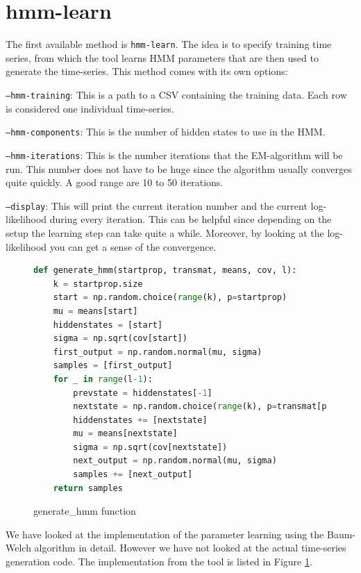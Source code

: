 \section{hmm-learn}

The first available method is \texttt{hmm-learn}. The idea is to specify training time series, from which the tool learns HMM parameters that are then used to generate the time-series. This method comes with its own options:

\texttt{---hmm-training}: This is a path to a CSV containing the training data. Each row is considered one individual time-series. 

\texttt{---hmm-components}: This is the number of hidden states to use in the HMM. 

\texttt{---hmm-iterations}: This is the number iterations that the EM-algorithm will be run. This number does not have to be huge since the algorithm usually converges quite quickly. A good range are 10 to 50 iterations.

\texttt{---display}: This will print the current iteration number and the current log-likelihood during every iteration. This can be helpful since depending on the setup the learning step can take quite a while. Moreover, by looking at the log-likelihood you can get a sense of the convergence. 

\begin{figure}
\begin{singlespace}
\begin{lstlisting}[language=Python]
def generate_hmm(startprop, transmat, means, cov, l):
    k = startprop.size
    start = np.random.choice(range(k), p=startprop)
    mu = means[start]
    hiddenstates = [start]
    sigma = np.sqrt(cov[start])
    first_output = np.random.normal(mu, sigma)
    samples = [first_output]
    for _ in range(l-1):
        prevstate = hiddenstates[-1]
        nextstate = np.random.choice(range(k), p=transmat[prevstate])
        hiddenstates += [nextstate]
        mu = means[nextstate]
        sigma = np.sqrt(cov[nextstate])
        next_output = np.random.normal(mu, sigma)
        samples += [next_output]
    return samples
\end{lstlisting}
\end{singlespace}
\caption{generate\_hmm function}    
\label{fig:hmm-generate}
\end{figure}

We have looked at the implementation of the parameter learning using the Baum-Welch algorithm in detail. However we have not looked at the actual time-series generation code. The implementation from the tool is listed in Figure \ref{fig:hmm-generate}. 

